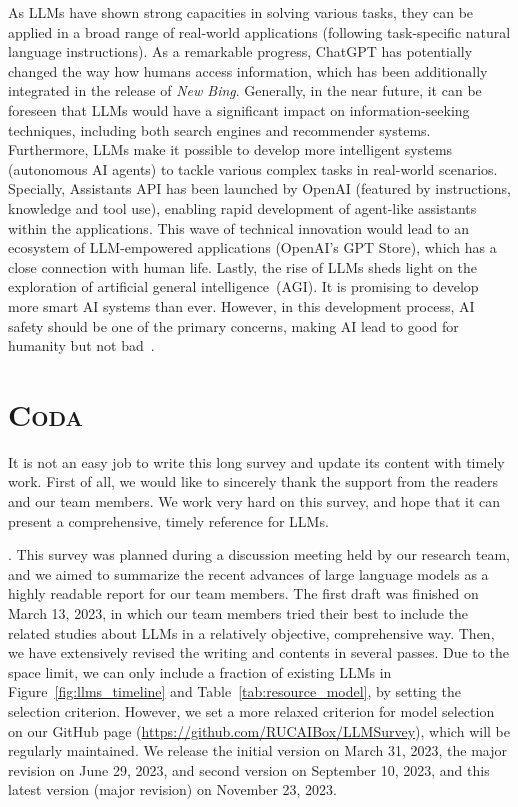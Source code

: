 {
As LLMs have shown strong capacities  in solving various tasks, they can be applied in a broad range of real-world applications (\ie following task-specific natural language instructions).   %
As a remarkable progress, ChatGPT has potentially changed the way how humans access information, which has been additionally integrated in  the release of \emph{New Bing}. Generally, in the near future, it can be foreseen that LLMs would have a significant impact on  information-seeking techniques, including both search engines and recommender systems.
Furthermore, LLMs make it possible to develop more intelligent systems (\eg autonomous AI agents) to tackle various complex tasks in real-world scenarios.  
Specially, Assistants API has been launched by OpenAI (featured by  instructions, knowledge and tool use), enabling rapid development of agent-like assistants within the applications.  
This wave of technical innovation would  lead to an  ecosystem of LLM-empowered applications (\eg OpenAI’s GPT Store), which has a close connection  with human life.   
Lastly, the rise of LLMs sheds light on the exploration of artificial general intelligence~(AGI). It is promising to develop more smart AI systems than ever. However, in this development process, AI safety should be one of the primary concerns, \ie making AI lead to good for humanity but not bad~\cite{OpenAI-blog-2023-Planning}.  


\section*{\textsc{Coda}}
It is not an easy job to write this long survey and update its content with timely work. First of all, we would like to sincerely thank the support from the readers and our team members. We work very hard on this survey, and hope that it can present a comprehensive, timely reference for LLMs. 

. This survey was planned during a   discussion meeting held by our research team, and we aimed to summarize the recent advances of large language models as a highly readable report for our team members. The first draft was finished on March 13, 2023, in which our team members tried their best to include the related studies about LLMs in a relatively  objective, comprehensive way. 
Then, we have extensively revised the writing and contents in several passes.  
Due to the space limit, we can only include a fraction of existing  LLMs in Figure~\ref{fig:llms_timeline} and Table~\ref{tab:resource_model}, by setting the selection criterion.
However, we set a more relaxed criterion for model selection on our GitHub page (\url{https://github.com/RUCAIBox/LLMSurvey}), which will be regularly maintained. 
We release the initial version on March 31, 2023,  the major revision on June 29, 2023, and second   version on September 10, 2023, and this latest version (major revision) on November 23,  2023. 

}
